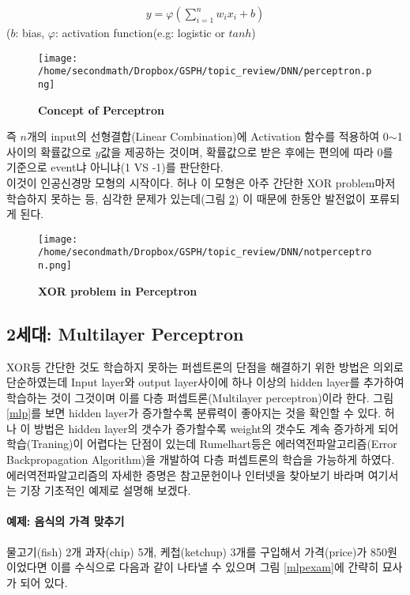 \documentclass[10pt]{article}
\begin{document}
\begin{align}
y=\varphi(\sum_{i=1}^n w_ix_i+b)
\end{align}
($b$: bias, $\varphi$: activation function(e.g: logistic or $tanh$)

\begin{figure}[!ht]
\centering
\texttt{[image: /home/secondmath/Dropbox/GSPH/topic\_review/DNN/perceptron.png]}
\caption{\bf {Concept of Perceptron}}
\label{perceptron1}
\end{figure}

즉 $n$개의 input의 선형결합(Linear Combination)에 Activation 함수를 적용하여 0$\sim$1 사이의 확률값으로 $y$값을 제공하는 것이며, 확률값으로 받은 후에는 편의에 따라 0를 기준으로 event냐 아니냐(1 VS -1)를 판단한다. \\

이것이 인공신경망 모형의 시작이다. 허나 이 모형은 아주 간단한 XOR problem마저 학습하지 못하는 등, 심각한 문제가 있는데(그림 \ref{perceptron2}) 이 때문에 한동안 발전없이 포류되게 된다\cite{perceptroncant}.


\begin{figure}[!ht]
\centering
\texttt{[image: /home/secondmath/Dropbox/GSPH/topic\_review/DNN/notperceptron.png]}
\caption{\bf {XOR problem in  Perceptron}}
\label{perceptron2}
\end{figure}

\subsection{2세대: Multilayer Perceptron}
XOR등 간단한 것도 학습하지 못하는 퍼셉트론의 단점을 해결하기 위한 방법은 의외로 단순하였는데 Input layer와 output layer사이에 하나 이상의 hidden layer를 추가하여 학습하는 것이 그것이며 이를 다층 퍼셉트론(Multilayer perceptron)이라 한다. 그림 \ref{mlp}를 보면 hidden layer가 증가할수록 분류력이 좋아지는 것을 확인할 수 있다.  
허나 이 방법은 hidden layer의 갯수가 증가할수록 weight의 갯수도 계속 증가하게 되어 학습(Traning)이 어렵다는 단점이 있는데 Rumelhart등은 에러역전파알고리즘(Error Backpropagation Algorithm)을 개발하여 다층 퍼셉트론의 학습을 가능하게 하였다\cite{rumelhart1985learning}. 에러역전파알고리즘의 자세한 증명은 참고문헌이나 인터넷을 찾아보기 바라며 여기서는 기장 기초적인 예제로 설명해 보겠다. 

\paragraph{예제: 음식의 가격 맞추기\cite{perceptroncant}}
물고기(fish) 2개 과자(chip) 5개, 케첩(ketchup) 3개를 구입해서 가격(price)가 850원이었다면 이를 수식으로 다음과 같이 나타낼 수 있으며 그림 \ref{mlpexam}에 간략히 묘사가 되어 있다. 
\end{document}
